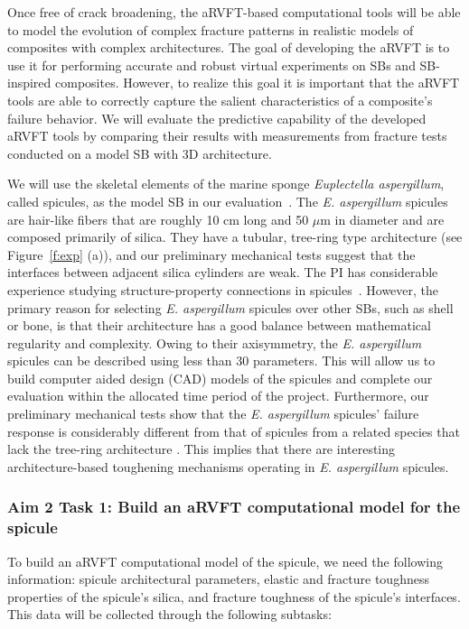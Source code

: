 \documentclass[10pt,letterpaper]{article}
\begin{document}
    Once free of crack broadening, the aRVFT-based computational tools will be able to model the evolution of complex fracture patterns in realistic models of composites with complex architectures.
    The goal of developing the aRVFT is to use it for performing accurate and robust virtual experiments on SBs and SB-inspired composites.
    However, to realize this goal it is important that the aRVFT tools are able to correctly capture the salient characteristics of a composite's failure behavior. We will evaluate the predictive capability of the developed aRVFT tools by comparing their results with measurements from fracture tests conducted on a model SB with 3D architecture.

    We will use the skeletal elements of the marine sponge \textit{Euplectella aspergillum}, called spicules, as the model SB in our evaluation~\cite{mayer2004lessons,sarikaya2001biomimetic}.
    The \textit{E. aspergillum} spicules are hair-like fibers that are roughly 10 cm long and 50 $\mu$m in diameter and are composed primarily of silica.
    They have a tubular, tree-ring type architecture (see Figure~\ref{f:exp} (a)), and our preliminary mechanical tests suggest that the interfaces between adjacent silica cylinders are weak.
    The PI has considerable experience studying structure-property connections in spicules~\cite{monn2015new,monn2017enhanced,monn2017new}.
    However, the primary reason for selecting \textit{E. aspergillum} spicules over other SBs, such as shell or bone, is that their architecture has a good balance between mathematical regularity and complexity.
     Owing to their axisymmetry, the \textit{E. aspergillum} spicules can be described using less than 30 parameters.
    This will allow us to build computer aided design (CAD) models of the spicules and complete our evaluation within the allocated time period of the project.
    Furthermore, our preliminary mechanical tests show that the \textit{E. aspergillum} spicules' failure response is considerably different from that of spicules from a related species that lack the tree-ring architecture \cite{monn2017enhanced}.
    This implies that there are interesting architecture-based toughening mechanisms operating in \textit{E. aspergillum} spicules.

    \subsubsection{Aim 2 Task 1:  Build an aRVFT computational model for the spicule}
      To build an aRVFT computational model of the spicule, we need the following information: spicule architectural parameters,
      elastic and fracture toughness properties of the spicule's silica,
      and fracture toughness of the spicule's interfaces.
      This data will be collected through the following subtasks:
\end{document}
